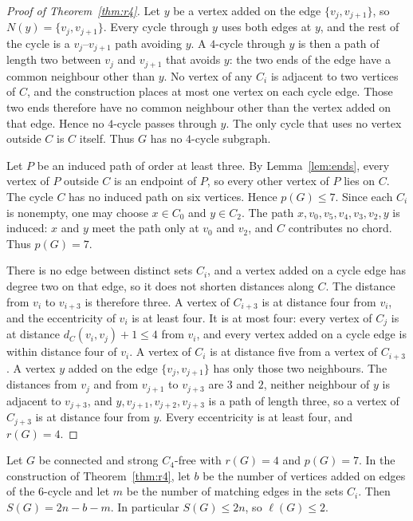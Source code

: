 \documentclass[ASNA]{USG}
\theoremstyle{WBstyletwo}
\numberwithin{equation}{section}
\newcommand{\lr}{\ell}
\newcommand{\pp}{p}
\begin{document}
\begin{proof}[Proof of Theorem~\ref{thm:r4}]
Let $y$ be a vertex added on the edge $\{v_j,v_{j+1}\}$, so $N(y)=\{v_j,v_{j+1}\}$. Every cycle through $y$ uses both edges at $y$, and the rest of the cycle is a $v_j$--$v_{j+1}$ path avoiding $y$. A $4$-cycle through $y$ is then a path of length two between $v_j$ and $v_{j+1}$ that avoids $y$: the two ends of the edge have a common neighbour other than $y$. No vertex of any $C_i$ is adjacent to two vertices of $C$, and the construction places at most one vertex on each cycle edge. Those two ends therefore have no common neighbour other than the vertex added on that edge. Hence no $4$-cycle passes through $y$. The only cycle that uses no vertex outside $C$ is $C$ itself. Thus $G$ has no $4$-cycle subgraph.

Let $P$ be an induced path of order at least three. By Lemma~\ref{lem:ends}, every vertex of $P$ outside $C$ is an endpoint of $P$, so every other vertex of $P$ lies on $C$. The cycle $C$ has no induced path on six vertices. Hence $\pp(G)\le 7$. Since each $C_i$ is nonempty, one may choose $x\in C_0$ and $y\in C_2$. The path $x,v_0,v_5,v_4,v_3,v_2,y$ is induced: $x$ and $y$ meet the path only at $v_0$ and $v_2$, and $C$ contributes no chord. Thus $\pp(G)=7$.

There is no edge between distinct sets $C_i$, and a vertex added on a cycle edge has degree two on that edge, so it does not shorten distances along $C$. The distance from $v_i$ to $v_{i+3}$ is therefore three. A vertex of $C_{i+3}$ is at distance four from $v_i$, and the eccentricity of $v_i$ is at least four. It is at most four: every vertex of $C_j$ is at distance $d_C(v_i,v_j)+1\le 4$ from $v_i$, and every vertex added on a cycle edge is within distance four of $v_i$. A vertex of $C_i$ is at distance five from a vertex of $C_{i+3}$. A vertex $y$ added on the edge $\{v_j,v_{j+1}\}$ has only those two neighbours. The distances from $v_j$ and from $v_{j+1}$ to $v_{j+3}$ are $3$ and $2$, neither neighbour of $y$ is adjacent to $v_{j+3}$, and $y,v_{j+1},v_{j+2},v_{j+3}$ is a path of length three, so a vertex of $C_{j+3}$ is at distance four from $y$. Every eccentricity is at least four, and $r(G)=4$.
\end{proof}

\begin{corollary}\label{cor:r4mass}
Let $G$ be connected and strong $C_4$-free with $r(G)=4$ and $\pp(G)=7$. In the construction of Theorem~\ref{thm:r4}, let $b$ be the number of vertices added on edges of the $6$-cycle and let $m$ be the number of matching edges in the sets $C_i$. Then $S(G)=2n-b-m$. In particular $S(G)\le 2n$, so $\lr(G)\le 2$.
\end{corollary}
\end{document}

